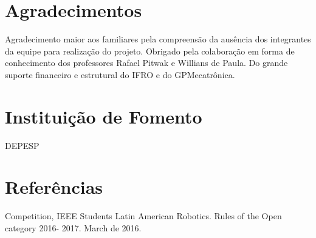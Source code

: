 \documentclass[article,12pt,onesidea,4paper,english,brazil]{abntex2}
\begin{document}
\section*{Agradecimentos}
Agradecimento maior aos familiares pela compreensão da ausência dos integrantes da equipe para realização do projeto. Obrigado pela colaboração em forma de conhecimento dos professores Rafael Pitwak e Willians de Paula. Do grande suporte financeiro e estrutural do IFRO e do GPMecatrônica.
	
	\section*{Instituição de Fomento}
	
DEPESP
	
	\section*{Referências}
	
	\noindent Competition, IEEE Students Latin American Robotics. Rules of the Open category 2016- 2017. March de 2016.
	
\end{document}
